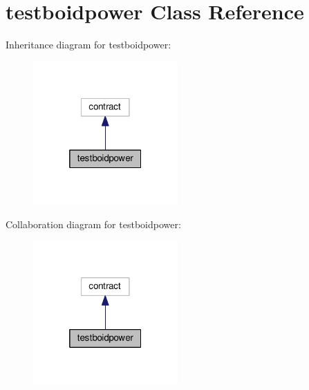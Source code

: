 \hypertarget{classtestboidpower}{}\section{testboidpower Class Reference}
\label{classtestboidpower}


Inheritance diagram for testboidpower\+:
\nopagebreak
\begin{figure}[H]
\begin{center}
\leavevmode
\includegraphics[width=157pt]{classtestboidpower__inherit__graph}
\end{center}
\end{figure}


Collaboration diagram for testboidpower\+:
\nopagebreak
\begin{figure}[H]
\begin{center}
\leavevmode
\includegraphics[width=157pt]{classtestboidpower__coll__graph}
\end{center}
\end{figure}
